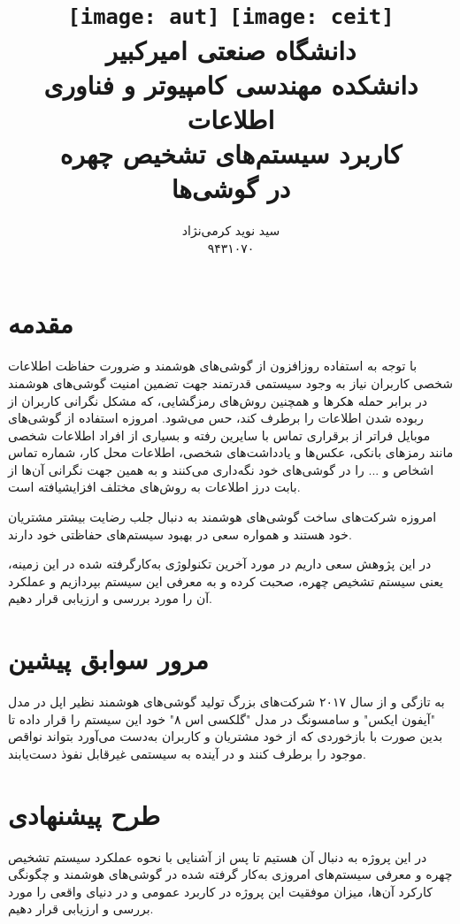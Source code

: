 \documentclass[paper=a4, fontsize=11pt]{article}
\title{
\normalfont\normalsize
\texttt{[image: aut]}
\hspace{5cm}
\texttt{[image: ceit]} \\
\textsc دانشگاه صنعتی امیرکبیر \\
\textsc دانشکده مهندسی کامپیوتر و فناوری اطلاعات
\horrule{0.5pt} \\ [0.4cm]
\huge کاربرد سیستم‌های تشخیص چهره\\ در گوشی‌ها
\horrule{2pt} \\ [0.5cm]
}
\author{سید نوید کرمی‌نژاد \\ ۹۴۳۱۰۷۰}
\begin{document}
\maketitle
\thispagestyle{empty}
\newpage
\setcounter{page}{1}

\section*{\LARGE مقدمه}

\par
با توجه به استفاده روزافزون از گوشی‌های هوشمند و ضرورت حفاظت اطلاعات شخصی کاربران نیاز به وجود سیستمی قدرتمند جهت تضمین امنیت گوشی‌های هوشمند در برابر حمله هکرها و همچنین روش‌های رمزگشایی، که مشکل نگرانی کاربران از ربوده شدن اطلاعات را برطرف کند،‌ حس می‌شود. امروزه استفاده از گوشی‌های موبایل فراتر از برقراری تماس با سایرین رفته و بسیاری از افراد اطلاعات شخصی مانند رمزهای بانکی، عکس‌ها و یادداشت‌های شخصی، اطلاعات محل کار، شماره تماس اشخاص و ... را در گوشی‌های خود نگه‌داری می‌کنند و به همین جهت نگرانی آن‌ها از بابت درز اطلاعات به روش‌های مختلف افزایشیافته است.

\par
امروزه شرکت‌های ساخت گوشی‌های هوشمند به دنبال جلب رضایت بیشتر مشتریان خود هستند و همواره سعی در بهبود سیستم‌های حفاظتی خود دارند.

\par
در این پژوهش سعی داریم در مورد آخرین تکنولوژی به‌کارگرفته شده در این زمینه، یعنی سیستم تشخیص چهره، صحبت کرده و به معرفی این سیستم بپردازیم و عملکرد آن را مورد بررسی و ارزیابی قرار دهیم.

\newline

\section*{\LARGE مرور سوابق پیشین }

\par
به تازگی و از سال ۲۰۱۷ شرکت‌های بزرگ تولید گوشی‌های هوشمند نظیر اپل در مدل "آیفون ایکس" و سامسونگ در مدل "گلکسی اس ۸" خود این سیستم را قرار داده تا بدین صورت با بازخوردی که از خود مشتریان و کاربران به‌دست می‌آورد بتواند نواقص موجود را برطرف کنند و در آینده به سیستمی غیرقابل نفوذ دست‌یابند.

\section*{\LARGE طرح پیشنهادی }

\par
در این پروژه به دنبال آن هستیم تا پس از آشنایی با نحوه عملکرد سیستم تشخیص چهره و معرفی سیستم‌های امروزی به‌کار گرفته شده در گوشی‌های هوشمند و چگونگی کارکرد آن‌ها، میزان موفقیت این پروژه در کاربرد عمومی و در دنیای واقعی را مورد بررسی و ارزیابی قرار دهیم.
\end{document}

